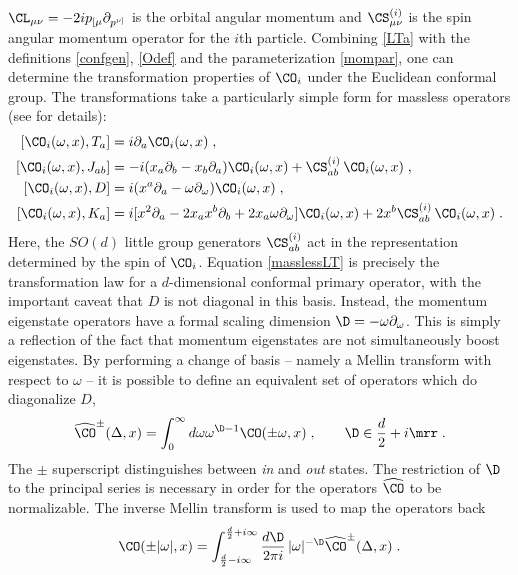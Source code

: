 \documentclass[11pt]{article}
\def\o{{\omega}}
\def\p{{\partial}}
\begin{document}
$\CL_{\mu\nu} = - 2 i p_{[\mu} \p_{p^{\nu]}}$ is the orbital angular momentum and $\CS^{(i)}_{\mu\nu}$ is the spin angular momentum operator for the $i$th particle. Combining  \eqref{LTa} with the definitions \eqref{confgen}, \eqref{Odef} and the parameterization \eqref{mompar}, one can determine the transformation properties of $\CO_i$ under the Euclidean conformal group. The transformations take a particularly simple form for massless operators (see \cite{Kapec:2017gsg} for details):
\begin{equation}
\begin{split}
\label{masslessLT}
[ \CO_i(\o,x) , T_a ] &=  i \p_a \CO_i(\o,x) \; , \\
[ \CO_i(\o,x) , J_{ab} ] &=  - i ( x_a  \p_b - x_b \p_a ) \CO_i(\o,x) + \CS^{(i)}_{ab}  \, \CO_i(\o,x) \; , \\
[ \CO_i(\o,x) , D ] &= i ( x^a \p_a - \o \p_\o ) \CO_i(\o,x) \;  , \\
[ \CO_i(\o,x) , K_a ] &= i  [ x^2  \p_a - 2 x_a x^b \p_b + 2 x_a \o \p_\o  ] \CO_i(\o,x) + 2 x^b \CS^{(i)}_{ab} \, \CO_i(\o,x) \;  . 
\end{split}
\end{equation}
Here, the $SO(d)$ little group generators $\CS^{(i)}_{ab}$ act in the representation determined by the spin of $\CO_i$. Equation \eqref{masslessLT} is precisely the transformation law for a $d$-dimensional conformal primary operator, with the important caveat that  $D$ is not diagonal in this basis.  Instead, the momentum eigenstate operators have a formal scaling dimension $\D = - \o \p_\o$. This is simply a reflection of the fact that momentum eigenstates are not simultaneously boost eigenstates. By performing a change of basis -- namely a Mellin transform with respect to $\o$ -- it is possible to define an equivalent set of operators which do diagonalize $D$,
\begin{equation}
\begin{split}\label{Mellin-transform}
\widehat{\CO}^\pm(\Delta,x) = \int_0^\infty d\o \o^{\D-1} \CO(\pm\o,x) \; , \qquad \D \in \frac{d}{2} + i \mrr \; . 
\end{split}
\end{equation}
The $\pm$ superscript distinguishes between \emph{in} and \emph{out} states. The restriction of $\D$ to the principal series is necessary in order for the operators ${\widehat \CO}$ to be normalizable. The inverse Mellin transform is used to map the operators back
\begin{equation}
\begin{split}\label{Inverse-Mellin-transform}
\CO(\pm|\o|,x)  = \int_{\frac{d}{2}-i\infty}^{\frac{d}{2}+i\infty} \frac{d\D}{2\pi i}  \, |\o|^{-\D} \widehat{\CO}^\pm(\Delta,x) \; . 
\end{split}
\end{equation}
\end{document}
